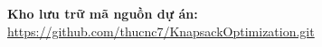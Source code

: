 \documentclass[10pt]{beamer}
\begin{document}
\begin{frame}
    \begin{center}
        \Huge \textbf{\color{deepblue}{CẢM ƠN THẦY CÔ VÀ CÁC BẠN ĐÃ LẮNG NGHE!}}
        
        \vspace{1.5em}
        \large \textbf{Kho lưu trữ mã nguồn dự án:} \\
        \small \url{https://github.com/thucnc7/KnapsackOptimization.git}
    \end{center}
\end{frame}
\end{document}
